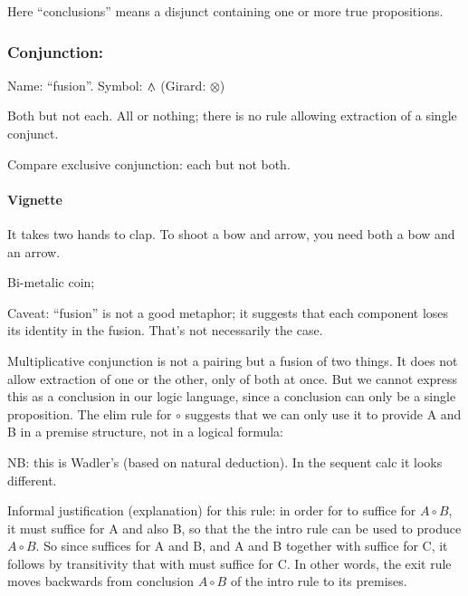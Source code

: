 \documentclass{article}
\begin{document}
Here ``conclusions'' means a disjunct containing one or more true
propositions.

\subsubsection[Conjunction: both but not each (fusion)]{Conjunction: \Fusion}

Name: ``fusion''.  Symbol: \(\fusion\) (Girard: \(\otimes\))

Both but not each. All or nothing; there is no rule allowing
extraction of a single conjunct.

Compare exclusive conjunction: each but not both.

\paragraph{Vignette\\}

It takes two hands to clap. To shoot a bow and arrow, you need both a
bow and an arrow.

Bi-metalic coin;

Caveat: ``fusion'' is not a good metaphor; it suggests that each
component loses its identity in the fusion. That's not necessarily the
case.

Multiplicative conjunction is not a pairing but a fusion of two
things. It does not allow extraction of one or the other, only of both
at once. But we cannot express this as a conclusion in our logic
language, since a conclusion can only be a single proposition. The
elim rule for \(\circ\) suggests that we can only use it to provide A
and B in a premise structure, not in a logical formula:

\begin{prooftree}
\end{prooftree}

NB: this is Wadler's (based on natural deduction). In the sequent calc
it looks different.

Informal justification (explanation) for this rule: in order for
\ContextG to suffice for \(A\circ B\), it must suffice for A and also
B, so that the the intro rule can be used to produce \(A\circ B\). So
since \ContextG suffices for A and B, and A and B together with
\ContextD suffice for C, it follows by transitivity that \ContextG
with \ContextD must suffice for C. In other words, the exit rule moves
backwards from conclusion \(A\circ B\) of the intro rule to its
premises.
\end{document}
